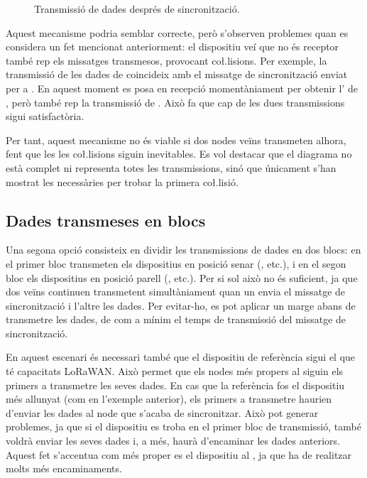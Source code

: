 \documentclass{tfgitic}[2024/07/01]
\begin{document}
{\begin{figure}
{\begin{tabular}
        \end{tabular}
    }
    \caption{Transmissió de dades després de sincronització.}
    \label{fig:app_opcioSyncExp1}
\end{figure}

Aquest mecanisme podria semblar correcte, però s'observen problemes quan es considera un fet mencionat anteriorment: el dispositiu veí que no és receptor també rep els missatges transmesos, provocant co\l.lisions. Per exemple, la transmissió de les dades de  coincideix amb el missatge de sincronització enviat per  a . En aquest moment  es posa en recepció momentàniament per obtenir l' de , però també rep la transmissió de . Això fa que cap de les dues transmissions sigui satisfactòria.

Per tant, aquest mecanisme no és viable si dos nodes veïns transmeten alhora, fent que les  les co\l.lisions siguin inevitables.
Es vol destacar que el diagrama no està complet ni representa totes les transmissions, sinó que únicament s'han mostrat les necessàries per trobar la primera co\l.lisió. 

\subsection{Dades transmeses en blocs}
Una segona opció consisteix en dividir les transmissions de dades en dos blocs: en el primer bloc transmeten els dispositius en posició senar (, etc.), i en el segon bloc els dispositius en posició parell (, etc.). Per si sol això no és suficient, ja que dos veïns continuen transmetent simultàniament quan un envia el missatge de sincronització i l'altre les dades. Per evitar-ho, es pot aplicar un marge abans de transmetre les dades, de com a mínim el temps de transmissió del missatge de sincronització. 

En aquest escenari és necessari també que el dispositiu de referència sigui el que té capacitats LoRaWAN. Això permet que els nodes més propers al  siguin els primers a transmetre les seves dades. En cas que la referència fos el dispositiu més allunyat (com en l'exemple anterior), els primers a transmetre haurien d'enviar les dades al node que s'acaba de sincronitzar. Això pot generar problemes, ja que si el dispositiu es troba en el primer bloc de transmissió, també voldrà enviar les seves dades i, a més, haurà d'encaminar les dades anteriors. Aquest fet s'accentua com més proper es el dispositiu al , ja que ha de realitzar molts més encaminaments.

}
\end{document}
